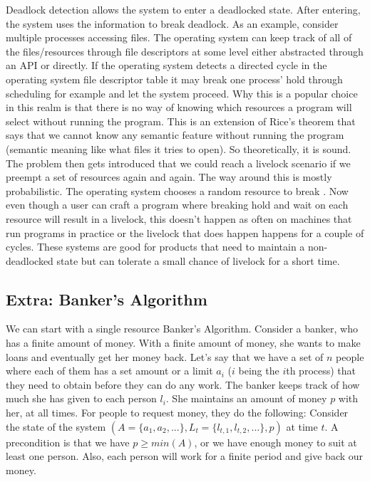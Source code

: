 Deadlock detection allows the system to enter a deadlocked state.
After entering, the system uses the information to break deadlock.
As an example, consider multiple processes accessing files.
The operating system can keep track of all of the files/resources through file descriptors at some level either abstracted through an API or directly.
If the operating system detects a directed cycle in the operating system file descriptor table it may break one process' hold through scheduling for example and let the system proceed.
Why this is a popular choice in this realm is that there is no way of knowing which resources a program will select without running the program.
This is an extension of Rice's theorem \cite{rice} that says that we cannot know any semantic feature without running the program (semantic meaning like what files it tries to open).
So theoretically, it is sound.
The problem then gets introduced that we could reach a livelock scenario if we preempt a set of resources again and again.
The way around this is mostly probabilistic.
The operating system chooses a random resource to break .
Now even though a user can craft a program where breaking hold and wait on each resource will result in a livelock, this doesn't happen as often on machines that run programs in practice or the livelock that does happen happens for a couple of cycles.
These systems are good for products that need to maintain a non-deadlocked state but can tolerate a small chance of livelock for a short time.

\subsection{Extra: Banker's Algorithm}

We can start with a single resource Banker's Algorithm.
Consider a banker, who has a finite amount of money.
With a finite amount of money, she wants to make loans and eventually get her money back.
Let's say that we have a set of $n$ people where each of them has a set amount or a limit $a_i$ ($i$ being the $i$th process) that they need to obtain before they can do any work.
The banker keeps track of how much she has given to each person $l_i$. She maintains an amount of money $p$ with her, at all times.
For people to request money, they do the following:
Consider the state of the system $(A=\{a_1, a_2, ...\}, L_t=\{l_{t,1}, l_{t,2}, ...\}, p)$ at time $t$.
A precondition is that we have $p \geq min(A)$, or we have enough money to suit at least one person.
Also, each person will work for a finite period and give back our money.

